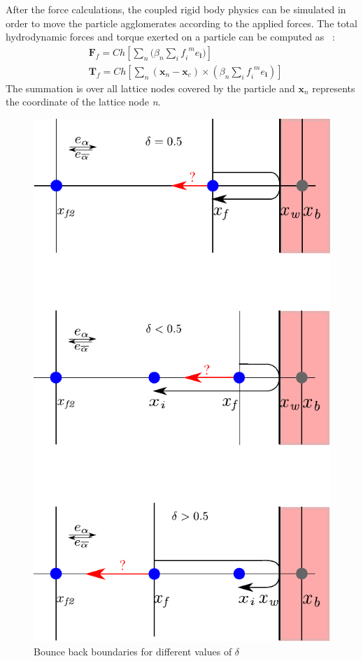 After the force calculations, the coupled rigid body physics can be simulated in order to move the particle agglomerates according to the applied forces. The total hydrodynamic forces and torque exerted on a particle can be computed as ~\citep{Cook2004, Noble1998}:
\begin{align}
& \mathbf{F}_{f} = \mathit{Ch}[\sum\limits_{\mathit{n}}{(\beta_{\mathit{n}} \sum\limits_{\mathit{i}}{\mathit{f_i}^{\mathit{ m}}\mathbf{\mathit{e}_i}}})] \\ 
& \mathbf{T}_{f} = \mathit{Ch}[\sum\limits_{\mathit{n}}{(\mathbf{x}_{\mathit{n}}-\mathbf{x}_{\mathit{c}}) \times (\beta_{\mathit{n}} \sum\limits_{\mathit{i}}{\mathit{f_i}^{\mathit{ m}}\mathbf{\mathit{e}_i}})}]
\end{align}
The summation is over all lattice nodes covered by the particle and $\mathbf{x}_{\mathit{n}}$ represents the coordinate of the lattice node \textit{n}.
\begin{figure}[htbp]
\centering
\includegraphics[scale=1]{Chapter3/figures/lbm/bouncemod.pdf}
\caption{Bounce back boundaries for different values of $\delta$}
\label{fig:bouncemod}
\end{figure}
